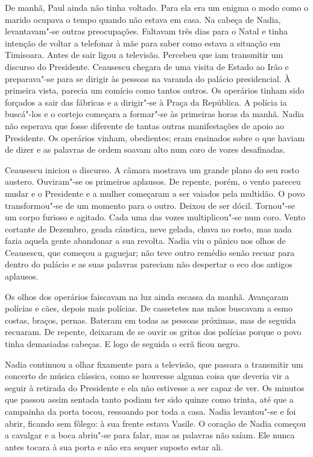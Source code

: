 De manhã, Paul ainda não tinha voltado. Para ela era um enigma o modo
como o marido ocupava o tempo quando não estava em casa. Na cabeça de
Nadia, levantavam"-se outras preocupações. Faltavam três dias para o
Natal e tinha intenção de voltar a telefonar à mãe para saber como
estava a situação em Timisoara. Antes de sair ligou a televisão.
Percebeu que iam transmitir um discurso do Presidente. Ceausescu chegara
de uma visita de Estado ao Irão e preparava"-se para se dirigir às
pessoas na varanda do palácio presidencial. À primeira vista, parecia um
comício como tantos outros. Os operários tinham sido forçados a sair
das fábricas e a dirigir"-se à Praça da República. A polícia ia buscá"-los
e o cortejo começara a formar"-se às primeiras horas da manhã. Nadia não
esperava que fosse diferente de tantas outras manifestações de apoio ao
Presidente. Os operários vinham, obedientes; eram ensinados sobre o
que haviam de dizer e as palavras de ordem soavam alto num coro de
vozes desafinadas.

Ceausescu iniciou o discurso. A câmara mostrava um
grande plano do seu rosto austero. Ouviram"-se os primeiros aplausos.
De repente, porém, o vento pareceu mudar e o Presidente e a mulher
começaram a ser vaiados pela multidão. O povo transformou"-se de um
momento para o outro. Deixou de ser dócil. Tornou"-se um corpo furioso e
agitado. Cada uma das vozes multiplicou"-se num coro. Vento cortante de
Dezembro, geada cáustica, neve gelada, chuva no rosto, mas nada fazia
aquela gente abandonar a sua revolta. Nadia viu o pânico nos olhos de
Ceausescu,
que começou a gaguejar; não teve outro remédio senão recuar para dentro
do palácio e as suas palavras pareciam não despertar o eco dos antigos
aplausos.

Os olhos dos operários faiscavam na luz ainda escassa da manhã.
Avançaram polícias e cães, depois mais polícias. De cassetetes nas mãos
buscavam a esmo costas, braços, pernas. Bateram em todas as pessoas
próximas, mas de seguida recuaram. De repente, deixaram de se ouvir os
gritos dos polícias porque o povo tinha demasiadas cabeças. E logo de
seguida o ecrã ficou negro.

Nadia continuou a olhar fixamente para a televisão, que passara a
transmitir um concerto de música clássica, como se houvesse alguma coisa
que deveria vir a seguir à retirada do Presidente e ela não estivesse a
ser capaz de ver. Os minutos que passou assim sentada tanto podiam ter
sido quinze como trinta, até que a campainha da porta tocou, ressoando
por toda a casa. Nadia levantou"-se e foi abrir, ficando sem fôlego: à sua frente estava Vasile. O
coração de Nadia começou a cavalgar e a boca abriu"-se para falar, mas as
palavras não saíam. Ele nunca antes tocara à sua porta e não era sequer
suposto estar ali.

